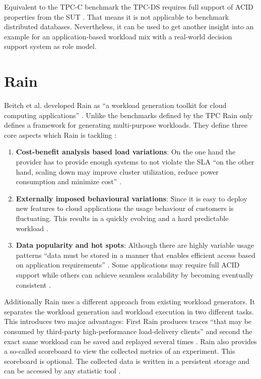 Equivalent to the \ac{TPC}-C benchmark the \ac{TPC}-DS requires full support of ACID properties from the \ac{SUT} \cite[72]{tpcds.2012}. That means it is not applicable to benchmark distributed databases. Nevertheless, it can be used to get another insight into an example for an application-based workload mix with a real-world decision support system as role model.

\section{Rain}
\label{sec:rain}
Beitch et al. developed Rain as \enquote{a workload generation toolkit for cloud computing applications} \cite{rain.2010}. Unlike the benchmarks defined by the \ac{TPC} Rain only defines a framework for generating multi-purpose workloads. They define three core aspects which Rain is tackling \cite[1 - 2]{rain.2010}:

\begin{enumerate}
  \item \textbf{Cost-benefit analysis based load variations}: On the one hand the provider has to provide enough systems to not violate the \acf{SLA} \enquote{on the other hand, scaling down may improve cluster utilization, reduce power consumption and minimize cost} \cite[1]{rain.2010}.
  \item \textbf{Externally imposed behavioural variations}: Since it is easy to deploy new features to cloud applications the usage behaviour of customers is fluctuating. This results in a quickly evolving and a hard predictable workload \cite[1]{rain.2010}.
  \item \textbf{Data popularity and hot spots}: Although there are highly variable usage patterns \enquote{data must be stored in a manner that enables efficient access based on application requirements} \cite[2]{rain.2010}. Some applications may require full ACID support while others can achieve seamless scalability by becoming eventually consistent \cite[2]{rain.2010}.
\end{enumerate}

Additionally Rain uses a different approach from existing workload generators. It separates the workload generation and workload execution in two different tasks. This introduces two major advantages: First Rain produces traces \enquote{that may be consumed by third-party high-performance load-delivery clients} \cite[3]{rain.2010} and second the exact same workload can be saved and replayed several times \cite[3]{rain.2010}. Rain also provides a so-called scoreboard to view the collected metrics of an experiment. This scoreboard is optional. The collected data is written in a persistent storage and can be accessed by any statistic tool \cite[4]{rain.2010}.


